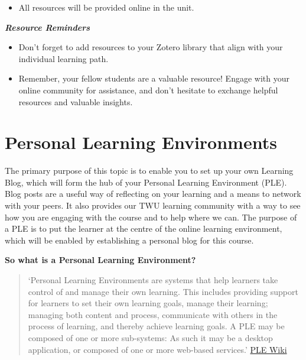 \documentclass[
]{book}
\providecommand{\tightlist}{%
  \setlength{\itemsep}{0pt}\setlength{\parskip}{0pt}}
\theoremstyle{definition}
\theoremstyle{definition}
\theoremstyle{definition}
\theoremstyle{definition}
\theoremstyle{remark}
\begin{document}
\begin{itemize}
\tightlist
\item
  All resources will be provided online in the unit.
\end{itemize}

\begin{feedback}
\textbf{\emph{Resource Reminders}}

\begin{itemize}
\tightlist
\item
  Don't forget to add resources to your Zotero library that align with
  your individual learning path.\\
\item
  Remember, your fellow students are a valuable resource! Engage with
  your online community for assistance, and don't hesitate to exchange
  helpful resources and valuable insights.
\end{itemize}
\end{feedback}

\hypertarget{personal-learning-environments}{%
\section{Personal Learning Environments}\label{personal-learning-environments}}

The primary purpose of this topic is to enable you to set up your own Learning Blog, which will form the hub of your Personal Learning Environment (PLE). Blog posts are a useful way of reflecting on your learning and a means to network with your peers. It also provides our TWU learning community with a way to see how you are engaging with the course and to help where we can. The purpose of a PLE is to put the learner at the centre of the online learning environment, which will be enabled by establishing a personal blog for this course.

\textbf{So what is a Personal Learning Environment?}

\begin{quote}
`Personal Learning Environments are systems that help learners take control of and manage their own learning. This includes providing support for learners to set their own learning goals, manage their learning; managing both content and process, communicate with others in the process of learning, and thereby achieve learning goals. A PLE may be composed of one or more sub-systems: As such it may be a desktop application, or composed of one or more web-based services.' \href{https://edutechwiki.unige.ch/en/Personal_learning_environment}{PLE Wiki}
\end{quote}
\end{document}
